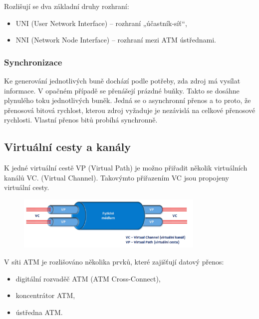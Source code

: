 Rozlišují se dva základní druhy rozhraní:
\begin{itemize}
    \item UNI (User Network Interface) – rozhraní „účastník-síť“,
    \item NNI (Network Node Interface) – rozhraní mezi ATM ústřednami.
\end{itemize}

\subsubsection{Synchronizace}
Ke generování jednotlivých buně dochází podle potřeby, zda zdroj má vysílat informace. V opačném případě se přenášejí prázdné buňky. Takto se dosáhne
plynulého toku jednotlivých buněk. Jedná se o asynchronní přenos a to proto, že přenosová bitová rychlost, kterou zdroj vyžaduje je nezávislá na celkové přenosové rychlosti.  Vlastní přenos bitů probíhá synchronně. 

\subsection{Virtuální cesty a kanály}
K jedné virtuální cestě VP (Virtual Path) je možno přiřadit několik virtuálních kanálů VC. (Virtual Channel). Takovýmto přiřazením VC jsou propojeny virtuální cesty.

\begin{figure} [h]
    \centering
    \includegraphics[width=0.8\textwidth]{snimky/VC.png}
    \label{fig:uml}
\end{figure}

V síti ATM je rozlišováno několika prvků, které zajišťují datový přenos:
\begin{itemize}
    \item digitální rozvaděč ATM (ATM Cross-Connect),
    \item koncentrátor ATM,
    \item ústředna ATM.
\end{itemize}


